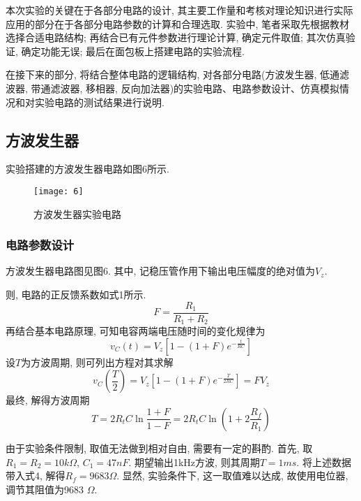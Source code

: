 \documentclass[UTF2]{ctexart}
\begin{document}
	本次实验的关键在于各部分电路的设计, 其主要工作量和考核对理论知识进行实际应用的部分在于各部分电路参数的计算和合理选取. 实验中, 笔者采取先根据教材选择合适电路结构; 再结合已有元件参数进行理论计算, 确定元件取值; 其次仿真验证, 确定功能无误; 最后在面包板上搭建电路的实验流程.
	
	在接下来的部分, 将结合整体电路的逻辑结构, 对各部分电路(方波发生器, 低通滤波器, 带通滤波器, 移相器, 反向加法器)的实验电路、电路参数设计、仿真模拟情况和对实验电路的测试结果进行说明.
	\subsection{方波发生器} 
	
	实验搭建的方波发生器电路如图6所示. 
	
	\begin{figure}[h]
		\centering
		\texttt{[image: 6]}
		\caption{方波发生器实验电路}
	\end{figure}
	
	\subsubsection{电路参数设计}
	
	方波发生器电路图见图6. 其中, 记稳压管作用下输出电压幅度的绝对值为$V_z$.
	
	则, 电路的正反馈系数如式1所示.
	\begin{equation}
    	F = \frac{R_1}{R_1 + R_2}
	\end{equation}
	再结合基本电路原理, 可知电容两端电压随时间的变化规律为
	\begin{equation}
		v_C(t) = V_z \left[1 - (1 + F) e^{-\frac{t}{R C}}\right]
	\end{equation}
	设$T$为方波周期, 则可列出方程对其求解
	\begin{equation}
		v_C\left(\frac{T}{2}\right) = V_z \left[1 - (1 + F) e^{-\frac{T}{2 R C}}\right] = F V_z
	\end{equation}
	最终, 解得方波周期
	\begin{equation}
		T = 2 R_t C \ln \frac{1 + F}{1 - F} = 2 R_t C \ln \left(1 + 2 \frac{R_f}{R_1}\right)
	\end{equation}
	
	由于实验条件限制, 取值无法做到相对自由, 需要有一定的斟酌. 首先, 取$R_1 = R_2 = 10k \Omega$, $C_1 = 47nF$. 期望输出1kHz方波, 则其周期$T = 1 ms$. 将上述数据带入式4, 解得$R_f = 9683 \Omega$. 显然, 实验条件下, 这一取值难以达成, 故使用电位器, 调节其阻值为9683 $\Omega$.
	
\end{document}
